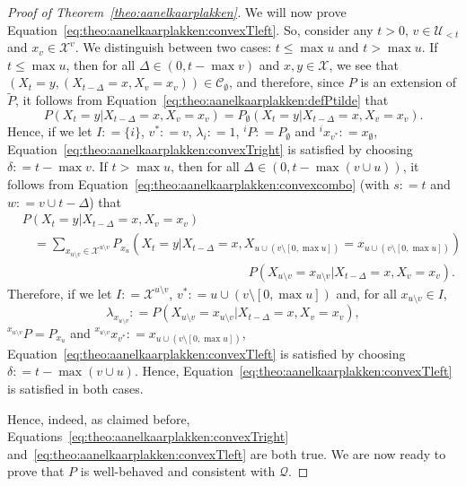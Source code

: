 \documentclass[10pt]{paper}
\theoremstyle{definition}
\newcommand{\states}{\mathcal{X}}
\newcommand{\coloneqq}{:\!=}
\begin{document}
\begin{proof}[Proof of Theorem~\ref{theo:aanelkaarplakken}]
We will now prove Equation~\eqref{eq:theo:aanelkaarplakken:convexTleft}. So, consider any $t>0$, $v\in\mathcal{U}_{<t}$ and $x_v\in\states^v$.
We distinguish between two cases: $t\leq\max u$ and $t>\max u$. If $t\leq\max u$, then for all $\Delta\in(0,t-\max v)$ and $x,y\in\states$, we see that $(X_{t}=y,(X_{t-\Delta}=x, X_v=x_v))\in\mathcal{C}_\emptyset$, and therefore, since $P$ is an extension of $\tilde{P}$, it follows from Equation~\eqref{eq:theo:aanelkaarplakken:defPtilde} that
\begin{equation*}
P(X_{t}=y\vert X_{t-\Delta}=x, X_v=x_v)
=P_\emptyset(X_{t}=y\vert X_{t-\Delta}=x, X_v=x_v).
\end{equation*}
Hence, if we let $I\coloneqq\{i\}$, $v^*\coloneqq v$, $\lambda_i\coloneqq 1$, ${}^iP\coloneqq P_\emptyset$ and ${}^ix_{v^*}\coloneqq x_\emptyset$, Equation~\eqref{eq:theo:aanelkaarplakken:convexTright} is satisfied by choosing $\delta\coloneqq t-\max v$.
If $t>\max u$, then for all $\Delta\in(0,t-\max(v\cup u))$, it follows from Equation~\eqref{eq:theo:aanelkaarplakken:convexcombo} (with $s\coloneqq t$ and $w\coloneqq v\cup {t-\Delta}$) that
\begin{align*}
&P(X_{t}=y\vert X_{t-\Delta}=x, X_v=x_v)\\
&~~~~=
\sum_{x_{u\setminus v}\in\states^{u\setminus v}}
P_{x_u}(X_{t}=y\vert X_{t-\Delta}=x, 
X_{u\cup(v\setminus [0,\max u])}= 
x_{u\cup(v\setminus [0,\max u])})\\[-4mm]
&\quad\quad\quad\quad\quad\quad\quad\quad\quad\quad\quad\quad\quad\quad\quad\quad\quad\quad
P(X_{u\setminus v}=x_{u\setminus v}
\vert X_{t-\Delta}=x, X_v=x_v).
\end{align*}
Therefore, if we let $I\coloneqq\states^{u\setminus v}$, $v^*\coloneqq u\cup(v\setminus [0,\max u])$ and, for all $x_{u\setminus v}\in I$,
\begin{equation*}
\lambda_{x_{u\setminus v}}
\coloneqq P(X_{u\setminus v}=x_{u\setminus v}
\vert X_{t-\Delta}=x, X_v=x_v),
\end{equation*}
${}^{x_{u\setminus v}}P=P_{x_u}$ and ${}^{x_{u\setminus v}}x_{v^*}\coloneqq
x_{ u\cup(v\setminus [0,\max u])}$, Equation~\eqref{eq:theo:aanelkaarplakken:convexTleft} is satisfied by choosing $\delta\coloneqq t-\max(v\cup u)$.
Hence, Equation~\eqref{eq:theo:aanelkaarplakken:convexTleft} is satisfied in both cases.


Hence, indeed, as claimed before, Equations~\eqref{eq:theo:aanelkaarplakken:convexTright} and~\eqref{eq:theo:aanelkaarplakken:convexTleft} are both true.
We are now ready to prove that $P$ is well-behaved and consistent with $\mathcal{Q}$.


\end{proof}
\end{document}
